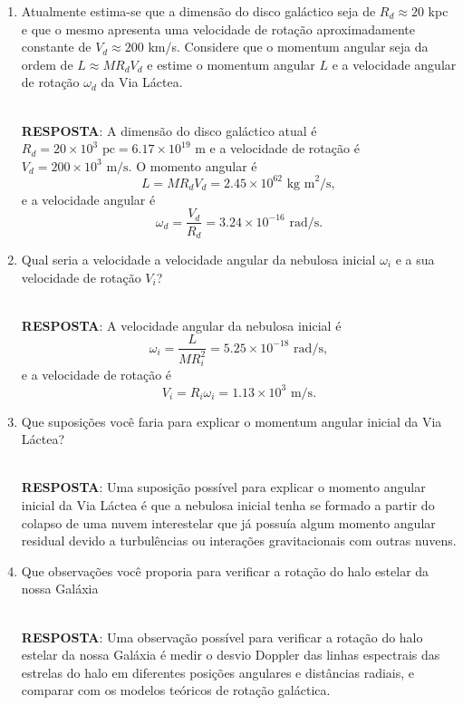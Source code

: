 \documentclass[a4paper,12pt]{article}
\begin{document}
\begin{enumerate}
\begin{enumerate}
\noindent\hrulefill

\item Atualmente estima-se que a dimensão do disco galáctico seja de $R_d\approx 20$ kpc e que o mesmo apresenta uma velocidade de rotação aproximadamente constante de $V_d\approx 200$ km/s. Considere que o momentum angular seja da ordem de $L\approx MR_dV_d$ e estime o momentum angular $L$ e a velocidade angular de rotação $\omega_d$ da Via Láctea.

\noindent\hrulefill\\\textbf{RESPOSTA}: A dimensão do disco galáctico atual é $R_d = 20 \times 10^3 \text{ pc} = 6.17 \times 10^{19} \text{ m}$ e a velocidade de rotação é $V_d = 200 \times 10^3 \text{ m/s}$. O momento angular é $$L = MR_dV_d = 2.45 \times 10^{62} \text{ kg m}^2/\text{s},$$ e a velocidade angular é $$\omega_d = \frac{V_d}{R_d} = 3.24 \times 10^{-16} \text{ rad/s}.$$

\noindent\hrulefill

\item Qual seria a velocidade a velocidade angular da nebulosa inicial $\omega_i$ e a sua velocidade de rotação $V_i$?

\noindent\hrulefill\\\textbf{RESPOSTA}: A velocidade angular da nebulosa inicial é $$\omega_i = \frac{L}{MR_i^2} = 5.25 \times 10^{-18} \text{ rad/s},$$ e a velocidade de rotação é $$V_i = R_i\omega_i = 1.13 \times 10^3 \text{ m/s}.$$

\noindent\hrulefill

\item Que suposições você faria para explicar o momentum angular inicial da Via Láctea?

\noindent\hrulefill\\\textbf{RESPOSTA}: Uma suposição possível para explicar o momento angular inicial da Via Láctea é que a nebulosa inicial tenha se formado a partir do colapso de uma nuvem interestelar que já possuía algum momento angular residual devido a turbulências ou interações gravitacionais com outras nuvens.

\noindent\hrulefill

\item Que observações você proporia para verificar a rotação do halo estelar da nossa Galáxia

\noindent\hrulefill\\\textbf{RESPOSTA}: Uma observação possível para verificar a rotação do halo estelar da nossa Galáxia é medir o desvio Doppler das linhas espectrais das estrelas do halo em diferentes posições angulares e distâncias radiais, e comparar com os modelos teóricos de rotação galáctica.


\end{enumerate}
\end{enumerate}
\end{document}
